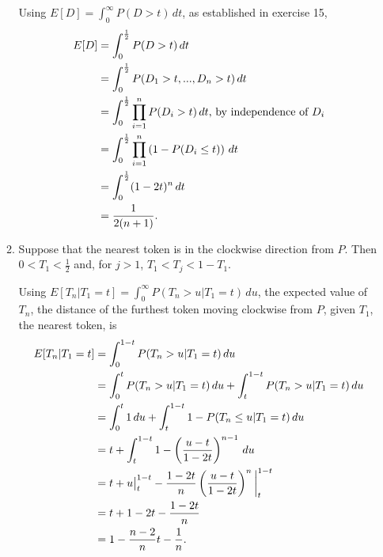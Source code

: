 \documentclass{article}
\begin{document}
\begin{enumerate}
\begin{enumerate}
        Using $E[D] = \int_0^\infty P(D>t)\,dt$, as established in exercise 15,
        \[\begin{split}
        E[D]    & = \int_0^\frac{1}{2} P(D>t) \,dt \\
                & = \int_0^\frac{1}{2} P(D_1>t, ..., D_n>t) \,dt \\
                & = \int_0^\frac{1}{2} \prod_{i=1}^n P( D_i>t )\, dt \text{, by independence of $D_i$} \\
                & = \int_0^\frac{1}{2} \prod_{i=1}^n \left(1-P(D_i \leq t)\right)\, dt \\
                & = \int_0^\frac{1}{2} (1-2t)^n\, dt \\
                & = \frac{1}{2(n+1)}\text.
    \end{split}\]
    \item
        Suppose that the nearest token is in the clockwise direction from $P$.
        Then $0 < T_1 < \frac{1}{2}$ and, for $j>1$, $T_1 < T_j < 1-T_1$.

        Using $E[T_n|T_1=t] = \int_0^\infty P(T_n>u|T_1=t)\,du$, the expected value of $T_n$, the distance of the furthest token moving clockwise from $P$, given $T_1$, the nearest token, is
        \[\begin{split}
        E[T_n|T_1=t]    & = \int_0^{1-t} P(T_n>u|T_1=t)\, du \\
                        & = \int_0^{t} P(T_n>u|T_1=t)\, du + \int_t^{1-t} P(T_n>u|T_1=t)\, du \\
                        & = \int_0^t 1\, du + \int_t^{1-t} 1-P(T_n\leq u|T_1=t)\, du \\
                        & = t + \int_t^{1-t} 1-\left(\frac{u-t}{1-2t}\right)^{n-1}\, du \\
                        & = t + u\big|^{1-t}_t - \frac{1-2t}{n}\left(\frac{u-t}{1-2t}\right)^n\bigg|^{1-t}_t \\
                        & = t + 1 - 2t - \frac{1-2t}{n} \\
                        & = 1-\frac{n-2}{n}t - \frac{1}{n}\text.
        \end{split}\]


\end{enumerate}
\end{enumerate}
\end{document}
